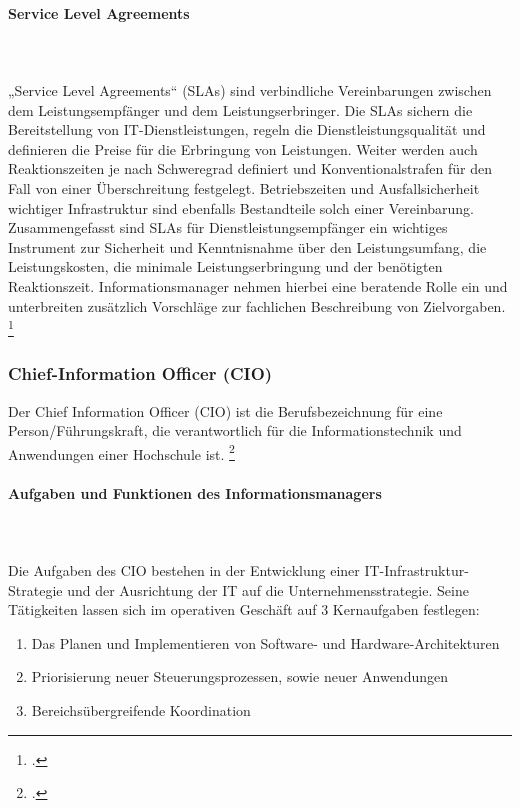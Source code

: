 \paragraph{Service Level Agreements}\mbox{}\\\\
„Service Level Agreements“ (SLAs) sind verbindliche Vereinbarungen zwischen dem Leistungsempfänger und dem Leistungserbringer. Die SLAs sichern die Bereitstellung von IT-Dienstleistungen, regeln die Dienstleistungsqualität und definieren die Preise für die Erbringung von Leistungen. Weiter werden auch Reaktionszeiten je nach Schweregrad definiert und Konventionalstrafen für den Fall von einer Überschreitung festgelegt. Betriebszeiten und Ausfallsicherheit wichtiger Infrastruktur sind ebenfalls Bestandteile solch einer Vereinbarung.
Zusammengefasst sind SLAs für Dienstleistungsempfänger ein wichtiges Instrument zur Sicherheit und Kenntnisnahme über den Leistungsumfang, die Leistungskosten, die minimale Leistungserbringung und der benötigten Reaktionszeit. Informationsmanager nehmen hierbei eine beratende Rolle ein und unterbreiten zusätzlich Vorschläge zur fachlichen Beschreibung von Zielvorgaben. \footcite[Vgl.][499]{heinrich_stelzer_2011}


\subsubsection{Chief-Information Officer (CIO)}
\label{subsubsection_cio}
Der Chief Information Officer (CIO) ist die Berufsbezeichnung für eine Person/Führungskraft, die verantwortlich für die Informationstechnik und Anwendungen einer Hochschule ist. \footcite[Vgl.][]{beuschel_2009}

\paragraph{Aufgaben und Funktionen des Informationsmanagers}\mbox{}\\\\
\label{aufgaben_funktionen_informationsmanager}
Die Aufgaben des CIO bestehen in der Entwicklung einer IT-Infrastruktur-Strategie und der Ausrichtung der IT auf die Unternehmensstrategie. Seine Tätigkeiten lassen sich im operativen Geschäft auf 3 Kernaufgaben festlegen: 
\begin{enumerate}
	\item Das Planen und Implementieren von Software- und Hardware-Architekturen 
	\item Priorisierung neuer Steuerungsprozessen, sowie neuer Anwendungen
	\item Bereichsübergreifende Koordination
\end{enumerate}

